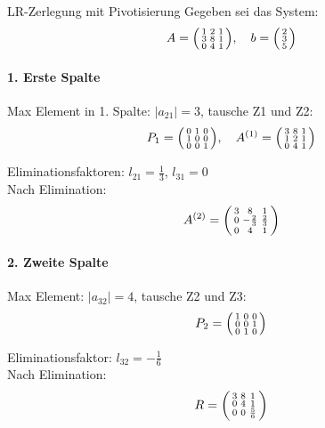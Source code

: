 \begin{example2}{LR-Zerlegung mit Pivotisierung}
Gegeben sei das System:
$$A = \begin{psmallmatrix}
1 & 2 & 1\\
3 & 8 & 1\\
0 & 4 & 1
\end{psmallmatrix}, \quad b = \begin{psmallmatrix}
2\\
3\\
5
\end{psmallmatrix}$$

\paragraph{1. Erste Spalte}
Max Element in 1. Spalte: $|a_{21}| = 3$, tausche Z1 und Z2:
$$P_1 = \begin{psmallmatrix}
0 & 1 & 0\\
1 & 0 & 0\\
0 & 0 & 1
\end{psmallmatrix}, \quad 
A^{(1)} = \begin{psmallmatrix}
3 & 8 & 1\\
1 & 2 & 1\\
0 & 4 & 1
\end{psmallmatrix}$$

Eliminationsfaktoren: $l_{21} = \frac{1}{3}$, $l_{31} = 0$\\
Nach Elimination:
$$A^{(2)} = \begin{psmallmatrix}
3 & 8 & 1\\
0 & -\frac{2}{3} & \frac{2}{3}\\
0 & 4 & 1
\end{psmallmatrix}$$

\paragraph{2. Zweite Spalte}
Max Element: $|a_{32}| = 4$, tausche Z2 und Z3:
$$P_2 = \begin{psmallmatrix}
1 & 0 & 0\\
0 & 0 & 1\\
0 & 1 & 0
\end{psmallmatrix}$$

Eliminationsfaktor: $l_{32} = -\frac{1}{6}$\\
Nach Elimination:
$$R = \begin{psmallmatrix}
3 & 8 & 1\\
0 & 4 & 1\\
0 & 0 & \frac{5}{6}
\end{psmallmatrix}$$


\end{example2}
